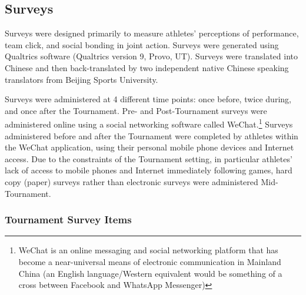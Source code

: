 \begin{CJK}{UTF8}{gbsn}


\subsection{Surveys}
Surveys were designed primarily to measure athletes' perceptions of performance, team click, and social bonding in joint action.  Surveys were generated using Qualtrics software (Qualtrics version 9, Provo, UT). Surveys were translated into Chinese and then back-translated by two independent native Chinese speaking translators from Beijing Sports University.

Surveys were administered at 4 different time points: once before, twice during, and once after the Tournament.  Pre- and Post-Tournament surveys were administered online using a social networking software called WeChat.\footnote{WeChat is an online messaging and social networking platform that has become a near-universal means of electronic communication in Mainland China (an English language/Western equivalent would be something of a cross between Facebook and WhatsApp Messenger)} Surveys administered before and after the Tournament were completed by athletes within the WeChat application, using their personal mobile phone devices and Internet access.  Due to the constraints of the Tournament setting, in particular athletes' lack of access to mobile phones and Internet immediately following games, hard copy (paper) surveys rather than electronic surveys were administered Mid-Tournament.





\subsubsection{Tournament Survey Items\label{survey:Tournament Survey Items}}


\end{CJK}
